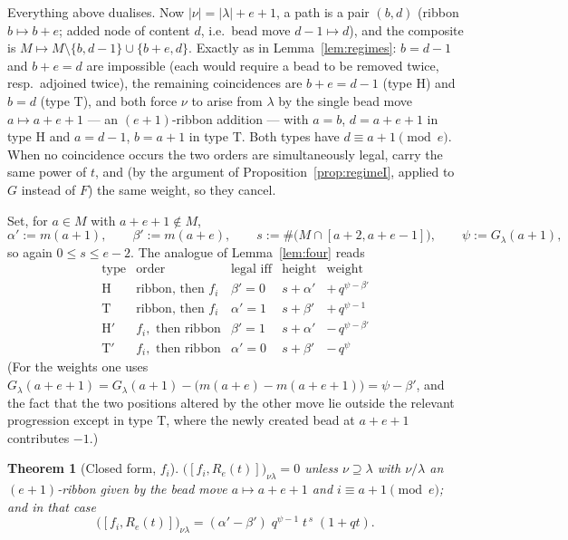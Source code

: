 \documentclass[11pt]{article}
\theoremstyle{plain}
\newtheorem{theorem}{Theorem}
\theoremstyle{definition}
\begin{document}
Everything above dualises. Now $|\nu|=|\lambda|+e+1$, a path is a pair
$(b,d)$ (ribbon $b\mapsto b+e$; added node of content $d$, i.e.\ bead move
$d-1\mapsto d$), and the composite is
$M\mapsto M\setminus\{b,d-1\}\cup\{b+e,d\}$. Exactly as in
Lemma~\ref{lem:regimes}: $b=d-1$ and $b+e=d$ are impossible (each would require a
bead to be removed twice, resp.\ adjoined twice), the remaining coincidences are
$b+e=d-1$ (type H) and $b=d$ (type T), and both force $\nu$ to arise from $\lambda$
by the single bead move $a\mapsto a+e+1$ --- an $(e+1)$-ribbon addition --- with
$a=b$, $d=a+e+1$ in type H and $a=d-1$, $b=a+1$ in type T. Both types have
$d\equiv a+1\pmod e$. When no coincidence occurs the two orders are simultaneously
legal, carry the same power of $t$, and (by the argument of
Proposition~\ref{prop:regimeI}, applied to $G$ instead of $F$) the same weight, so
they cancel.

Set, for $a\in M$ with $a+e+1\notin M$,
\[
\alpha':=m(a+1),\qquad \beta':=m(a+e),\qquad
s:=\#\big(M\cap[a+2,a+e-1]\big),\qquad \psi:=G_\lambda(a+1),
\]
so again $0\le s\le e-2$. The analogue of Lemma~\ref{lem:four} reads
\[
\begin{array}{lllll}
\text{type} & \text{order} & \text{legal iff} & \text{height} & \text{weight}\\[2pt]
\mathrm H  & \text{ribbon, then }f_i & \beta'=0 & s+\alpha' & +\,q^{\psi-\beta'}\\
\mathrm T  & \text{ribbon, then }f_i & \alpha'=1 & s+\beta' & +\,q^{\psi-1}\\
\mathrm H' & f_i,\text{ then ribbon} & \beta'=1 & s+\alpha' & -\,q^{\psi-\beta'}\\
\mathrm T' & f_i,\text{ then ribbon} & \alpha'=0 & s+\beta' & -\,q^{\psi}
\end{array}
\]
(For the weights one uses $G_\lambda(a+e+1)=G_\lambda(a+1)-\big(m(a+e)-m(a+e+1)\big)
=\psi-\beta'$, and the fact that the two positions altered by the other move lie
outside the relevant progression except in type $\mathrm T$, where the newly created
bead at $a+e+1$ contributes $-1$.)

\begin{theorem}[Closed form, $f_i$]\label{thm:main-f}
$\big([f_i,R_e(t)]\big)_{\nu\lambda}=0$ unless $\nu\supseteq\lambda$ with
$\nu/\lambda$ an $(e+1)$-ribbon given by the bead move $a\mapsto a+e+1$ and
$i\equiv a+1\pmod e$; and in that case
\[
\boxed{\ \big([f_i,R_e(t)]\big)_{\nu\lambda}
=(\alpha'-\beta')\;q^{\psi-1}\;t^{\,s}\;(1+qt).\ }
\]
\end{theorem}
\end{document}
